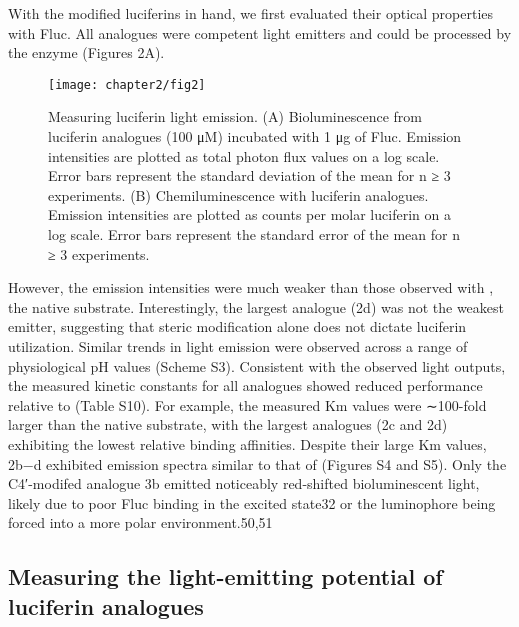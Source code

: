 With the modified luciferins in hand, we first
evaluated their optical properties with Fluc. All analogues were
competent light emitters and could be processed by the enzyme
(Figures 2A).
\begin{figure}[htbp]
\texttt{[image: chapter2/fig2]}
\centering
\caption[Measuring luciferin light emission]{Measuring luciferin light emission. (A) Bioluminescence
from luciferin analogues (100 μM) incubated with 1 μg of Fluc.
Emission intensities are plotted as total photon flux values on a log
scale. Error bars represent the standard deviation of the mean for n ≥ 3
experiments. (B) Chemiluminescence with luciferin analogues.
Emission intensities are plotted as counts per molar luciferin on a
log scale. Error bars represent the standard error of the mean for n ≥ 3
experiments.}
  \label{fig:chemilum_biolum}
\end{figure}
However, the emission intensities were much weaker than those observed with \dluciferin{}, the native
substrate. Interestingly, the largest analogue (2d) was not the
weakest emitter, suggesting that steric modification alone does
not dictate luciferin utilization. Similar trends in light emission
were observed across a range of physiological pH values
(Scheme S3). Consistent with the observed light outputs, the
measured kinetic constants for all analogues showed reduced performance relative to \dluciferin{} (Table S10). For example,
the measured Km values were ∼100-fold larger than the native
substrate, with the largest analogues (2c and 2d) exhibiting the
lowest relative binding affinities. Despite their large Km values,
2b−d exhibited emission spectra similar to that of \dluciferin{}
(Figures S4 and S5). Only the C4′-modifed analogue 3b
emitted noticeably red-shifted bioluminescent light, likely due
to poor Fluc binding in the excited state32 or the luminophore
being forced into a more polar environment.50,51

\subsection*{Measuring the light-emitting potential of luciferin analogues}

